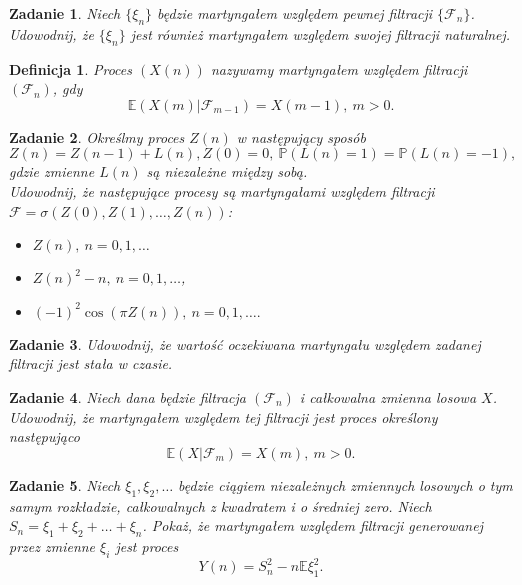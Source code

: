 \documentclass[12pt]{article}
\newtheorem{df}{Definicja}
\newtheorem{zd}{Zadanie}
\begin{document}
\begin{zd}
	Niech $\{\xi_n\}$ będzie martyngałem względem pewnej filtracji $\{\mathcal{F}_n\}$. Udowodnij, że $\{\xi_n\}$ jest również martyngałem względem swojej filtracji naturalnej.
\end{zd}
\begin{df}
	Proces $\left(X(n)\right)$ nazywamy martyngałem względem filtracji $\left(\mathcal{F}_n\right)$, gdy
	\begin{displaymath}
		\mathbb{E}\left(X(m)|\mathcal{F}_{m-1}\right) = X(m-1),\ m > 0.
	\end{displaymath}
\end{df}
\begin{zd}
	Określmy proces $Z(n)$ w następujący sposób 
	\begin{displaymath}
		Z(n) = Z(n-1) + L(n), Z(0) = 0,\  \mathbb{P}(L(n) = 1)  = \mathbb{P}(L(n) = -1),
	\end{displaymath}
	gdzie zmienne $L(n)$ są niezależne między sobą.\\
	Udowodnij, że następujące procesy są martyngałami względem filtracji $\mathcal{F} = \sigma\left(Z(0), Z(1), \dots, Z(n)\right)$:
	\begin{itemize}
		\item $Z(n), \ n= 0, 1, \dots$
		\item $Z(n)^2 - n, \ n= 0, 1, \dots$,
		\item $ (-1)^2\cos \left(\pi Z(n)\right), \ n= 0, 1, \dots.$
	\end{itemize}
\end{zd}
\begin{zd}
	Udowodnij, że wartość oczekiwana martyngału względem zadanej filtracji jest stała w czasie.
\end{zd}
\begin{zd}
	Niech dana będzie filtracja $\left(\mathcal{F}_n\right)$ i całkowalna zmienna losowa $X$. Udowodnij, że martyngałem względem tej filtracji jest proces określony następująco
	\begin{displaymath}
		\mathbb{E}\left(X|\mathcal{F}_{m}\right) = X(m),\ m > 0.
	\end{displaymath}
\end{zd}
\begin{zd}
	Niech $\xi_1, \xi_2, \dots$ będzie ciągiem niezależnych zmiennych losowych o tym samym rozkładzie, całkowalnych z kwadratem i o średniej zero. Niech $S_n = \xi_1 + \xi_2 + \dots + \xi_n$. Pokaż, że martyngałem względem filtracji generowanej przez zmienne $\xi_i$ jest proces \begin{displaymath}
		Y(n) = S_n^2 - n\mathbb{E}\xi_1^2.
	\end{displaymath}
\end{zd}
\end{document}
